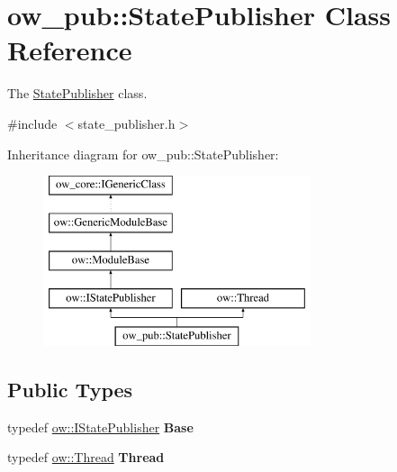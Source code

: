 \hypertarget{classow__pub_1_1StatePublisher}{}\section{ow\+\_\+pub\+:\+:State\+Publisher Class Reference}
\label{classow__pub_1_1StatePublisher}


The \hyperlink{classow__pub_1_1StatePublisher}{State\+Publisher} class.  




{\ttfamily \#include $<$state\+\_\+publisher.\+h$>$}

Inheritance diagram for ow\+\_\+pub\+:\+:State\+Publisher\+:\begin{figure}[H]
\begin{center}
\leavevmode
\includegraphics[height=5.000000cm]{d0/d12/classow__pub_1_1StatePublisher}
\end{center}
\end{figure}
\subsection*{Public Types}
\begin{DoxyCompactItemize}
\item 
typedef \hyperlink{classow_1_1IStatePublisher}{ow\+::\+I\+State\+Publisher} {\bfseries Base}\hypertarget{classow__pub_1_1StatePublisher_adcee9afe015eeb1d6496ee8c5897bfc4}{}\label{classow__pub_1_1StatePublisher_adcee9afe015eeb1d6496ee8c5897bfc4}

\item 
typedef \hyperlink{classow_1_1Thread}{ow\+::\+Thread} {\bfseries Thread}\hypertarget{classow__pub_1_1StatePublisher_a7aab05648d6ce254f88c7c4d4340cf9f}{}\label{classow__pub_1_1StatePublisher_a7aab05648d6ce254f88c7c4d4340cf9f}

\end{DoxyCompactItemize}
